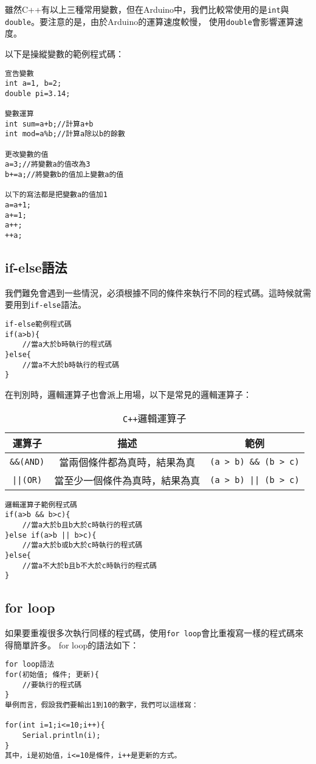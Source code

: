 \documentclass[12pt,a4paper]{article}
\begin{document}
雖然C++有以上三種常用變數，但在Arduino中，我們比較常使用的是\texttt{int}與\texttt{double}。要注意的是，由於Arduino的運算速度較慢，
使用\texttt{double}會影響運算速度。

以下是操縱變數的範例程式碼：


\begin{lstlisting}
宣告變數
int a=1, b=2;
double pi=3.14;

變數運算
int sum=a+b;//計算a+b
int mod=a%b;//計算a除以b的餘數

更改變數的值
a=3;//將變數a的值改為3
b+=a;//將變數b的值加上變數a的值

以下的寫法都是把變數a的值加1
a=a+1;
a+=1;
a++;
++a;
\end{lstlisting}
    
\subsection{if-else語法}
我們難免會遇到一些情況，必須根據不同的條件來執行不同的程式碼。這時候就需要用到\texttt{if-else}語法。


\begin{lstlisting}
if-else範例程式碼
if(a>b){
    //當a大於b時執行的程式碼
}else{
    //當a不大於b時執行的程式碼
}
\end{lstlisting}

在判別時，邏輯運算子也會派上用場，以下是常見的邏輯運算子：
\begin{table}[h!]
\centering
\begin{tabular}{|c|c|c|}
\hline
\textbf{運算子} & \textbf{描述} & \textbf{範例} \\ \hline
\texttt{\&\&(AND)}  & 當兩個條件都為真時，結果為真 & \texttt{(a > b) \&\& (b > c)} \\ \hline
\texttt{||(OR)}  & 當至少一個條件為真時，結果為真 & \texttt{(a > b) || (b > c)} \\ \hline
\end{tabular}
\caption{\texttt{C++}邏輯運算子}
\label{tab:logical_bitwise_operators}
\end{table}

\begin{lstlisting}
邏輯運算子範例程式碼
if(a>b && b>c){
    //當a大於b且b大於c時執行的程式碼
}else if(a>b || b>c){
    //當a大於b或b大於c時執行的程式碼
}else{
    //當a不大於b且b不大於c時執行的程式碼
}
\end{lstlisting}

\subsection{for loop}
如果要重複很多次執行同樣的程式碼，使用\texttt{for loop}會比重複寫一樣的程式碼來得簡單許多。
for loop的語法如下：
\begin{lstlisting}
for loop語法
for(初始值; 條件; 更新){
    //要執行的程式碼
}
舉例而言，假設我們要輸出1到10的數字，我們可以這樣寫：

for(int i=1;i<=10;i++){
    Serial.println(i);
}
其中，i是初始值，i<=10是條件，i++是更新的方式。
\end{lstlisting}
\end{document}
